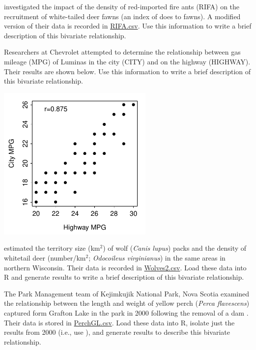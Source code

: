 \documentclass[10pt,openany]{book}\usepackage[]{graphicx}\usepackage[]{color}
\begin{document}
\begin{exsection}
  \item \label{revex:qbEDAAllen} \rhw{} \cite{Allenetal1997} investigated the impact of the density of red-imported fire ants (RIFA) on the recruitment of white-tailed deer fawns (an index of does to fawns).  A modified version of their data is recorded in \href{https://raw.githubusercontent.com/droglenc/NCData/master/RIFA.csv}{RIFA.csv}.  Use this information to write a brief description of this bivariate relationship. 

  \item \label{revex:qbEDAMPG} Researchers at Chevrolet attempted to determine the relationship between gas mileage (MPG) of Luminas in the city (CITY) and on the highway (HIGHWAY).  Their results are shown below.  Use this information to write a brief description of this bivariate relationship.

\begin{center}
  \includegraphics[width=3in]{Figs/ScatLumina-1}
\end{center}

  \item \label{revex:qbEDAMlad} \rhw{} \cite{Mladenoffetal1997} estimated the territory size (km$^{2}$) of wolf (\textit{Canis lupus}) packs and the density of whitetail deer (number/km$^{2}$; \textit{Odocoileus virginianus}) in the same areas in northern Wisconsin.  Their data is recorded in \href{https://raw.githubusercontent.com/droglenc/NCData/master/Wolves2.csv}{Wolves2.csv}.  Load these data into R and generate results to write a brief description of this bivariate relationship. 

  \item \label{revex:qbEDAPerch} \rhw{} The Park Management team of Kejimkujik National Park, Nova Scotia examined the relationship between the length and weight of yellow perch (\emph{Perca flavescens}) captured form Grafton Lake in the park in 2000 following the removal of a dam \citep{Brylinsky2001}.  Their data is stored in \href{https://raw.githubusercontent.com/droglenc/NCData/master/PerchGL.csv}{PerchGL.csv}.  Load these data into R, isolate just the results from 2000 (i.e., use ), and generate results to describe this bivariate relationship.  


\end{exsection}
\end{document}
